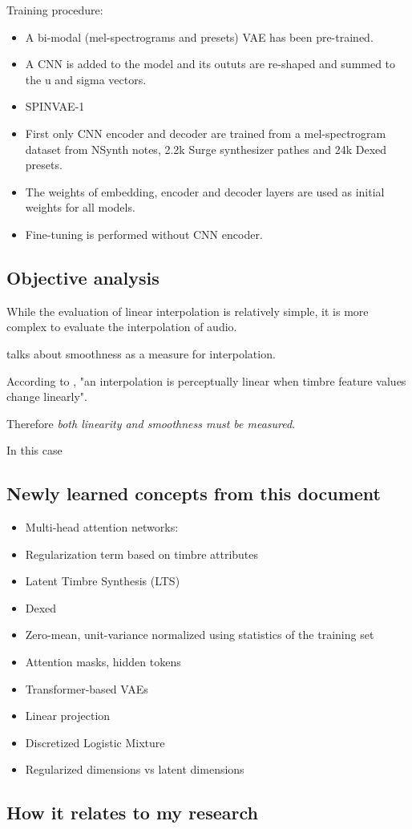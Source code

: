 Training procedure:

\begin{itemize}
    \item A bi-modal (mel-spectrograms and presets) VAE has been pre-trained.
    \item A CNN is added to the model and its oututs are re-shaped and summed to the u and sigma vectors.
    \item SPINVAE-1 \cite{SPINVAE1}
    \item First only CNN encoder and decoder are trained from a mel-spectrogram dataset from NSynth notes, 2.2k Surge synthesizer pathes and 24k Dexed presets.
    \item The weights of embedding, encoder and decoder layers are used as initial weights for all models.
    \item Fine-tuning is performed without CNN encoder.
\end{itemize}

\subsection{Objective analysis}

While the evaluation of linear interpolation is relatively simple, it is more complex to evaluate the interpolation of audio.

\cite{SPINVAE1} talks about smoothness as a measure for interpolation.

According to \cite{Sound_Morphing}, "an interpolation is perceptually linear when timbre feature values change linearly". 

Therefore \textit{both linearity and smoothness must be measured}.



In this case 

\subsection{Newly learned concepts from this document}

\begin{itemize}
    \item Multi-head attention networks:
    \item Regularization term based on timbre attributes
    \item Latent Timbre Synthesis (LTS) \cite{Latent_Timbre} 
    \item Dexed
    \item Zero-mean, unit-variance normalized using statistics of the training set
    \item Attention masks, hidden tokens
    \item Transformer-based VAEs
    \item Linear projection
    \item Discretized Logistic Mixture
    \item Regularized dimensions vs latent dimensions
\end{itemize}

\subsection{How it relates to my research}


